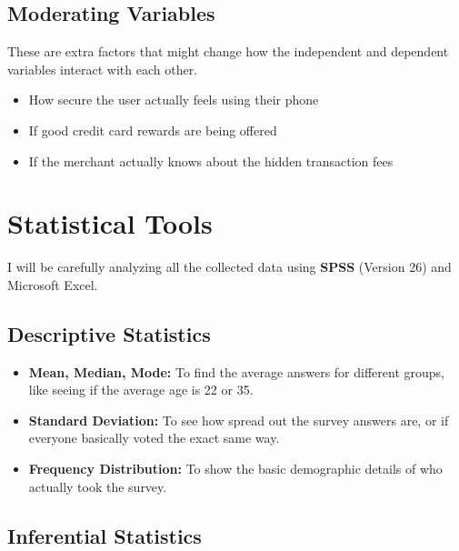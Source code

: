 \subsection{Moderating Variables}

These are extra factors that might change how the independent and dependent variables interact with each other.

\begin{itemize}
    \item How secure the user actually feels using their phone
    \item If good credit card rewards are being offered
    \item If the merchant actually knows about the hidden transaction fees
\end{itemize}

\section{Statistical Tools}

I will be carefully analyzing all the collected data using \textbf{SPSS} (Version 26) and Microsoft Excel.

\subsection{Descriptive Statistics}

\begin{itemize}
    \item \textbf{Mean, Median, Mode:} To find the average answers for different groups, like seeing if the average age is 22 or 35.
    \item \textbf{Standard Deviation:} To see how spread out the survey answers are, or if everyone basically voted the exact same way.
    \item \textbf{Frequency Distribution:} To show the basic demographic details of who actually took the survey.
\end{itemize}

\subsection{Inferential Statistics}

